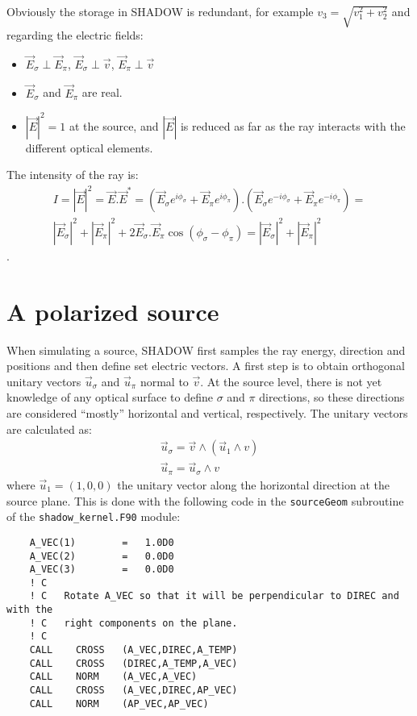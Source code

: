 \documentclass[a4paper,10pt]{article}
\begin{document}
Obviously the storage in SHADOW is redundant, for example $v_3=\sqrt{v_1^2+v_2^2}$ and regarding the electric
fields:
\begin{itemize}
 \item $\vec{E}_\sigma \perp \vec{E}_\pi$, $\vec{E}_\sigma \perp \vec{v}$, $\vec{E}_\pi \perp \vec{v}$
 \item $\vec{E}_\sigma$ and $\vec{E}_\pi$ are real.
 \item $|\vec{E}|^2=1$ at the source, and $|\vec{E}|$ is reduced as far as the ray interacts with the different 
 optical elements.
\end{itemize}

The intensity of the ray is:
\begin{eqnarray}
   I=|\vec{E}|^2 = \vec{E}.\vec{E}^* = (\vec{E}_\sigma e^{i \phi_\sigma} + \vec{E}_\pi e^{i\phi_\pi} ).
   (\vec{E}_\sigma e^{-i\phi_\sigma} + \vec{E}_\pi e^{-i\phi_\pi} ) =  \nonumber \\
   |\vec{E}_\sigma|^2 + |\vec{E}_\pi|^2 + 2 \vec{E}_\sigma.\vec{E}_\pi \cos(\phi_\sigma-\phi_\pi) =
   |\vec{E}_\sigma|^2 + |\vec{E}_\pi|^2
\end{eqnarray}.


\section{A polarized source}

When simulating a source, SHADOW first samples the ray energy, direction and positions and then define set electric vectors. 
A first step is to obtain orthogonal unitary vectors $\vec{u}_\sigma$ and $\vec{u}_\pi$ normal to $\vec{v}$. At the source 
level, there is not yet knowledge of any optical surface to define $\sigma$ and $\pi$ directions, so these directions 
are considered ``mostly'' horizontal and vertical, respectively. The unitary vectors are calculated as: 
\begin{eqnarray}
   \vec{u}_\sigma = \vec{v} \wedge (\vec{u}_1 \wedge{v}) \nonumber \\
   \vec{u}_\pi = \vec{u}_\sigma \wedge  {v}
\end{eqnarray}
where $\vec{u}_1=(1,0,0)$ the unitary vector along the horizontal direction at the source plane. 
This is done with the following code in the {\tt sourceGeom} subroutine of the 
{\tt shadow\_kernel.F90} module: 

\begin{lstlisting}
    A_VEC(1)		=   1.0D0
    A_VEC(2)		=   0.0D0
    A_VEC(3)		=   0.0D0
    ! C
    ! C   Rotate A_VEC so that it will be perpendicular to DIREC and with the
    ! C   right components on the plane.
    ! C 
    CALL	CROSS	(A_VEC,DIREC,A_TEMP)
    CALL	CROSS	(DIREC,A_TEMP,A_VEC)
    CALL	NORM	(A_VEC,A_VEC)
    CALL	CROSS	(A_VEC,DIREC,AP_VEC)
    CALL	NORM	(AP_VEC,AP_VEC)
\end{lstlisting} 
\end{document}
